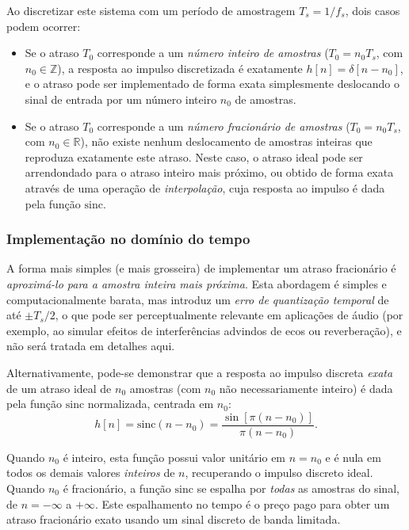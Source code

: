 \documentclass[a4paper,twoside,12pt]{article}
\begin{document}
	Ao discretizar este sistema com um período de amostragem $T_s = 1/f_s$, dois casos podem ocorrer:
	
	\begin{itemize}
		\item Se o atraso $T_0$ corresponde a um \emph{número inteiro de amostras} ($T_0 = n_0 T_s$, com $n_0 \in \mathbb{Z}$), a resposta ao impulso discretizada é exatamente $h[n] = \delta[n-n_0]$, e o atraso pode ser implementado de forma exata simplesmente deslocando o sinal de entrada por um número inteiro $n_0$ de amostras.
		
		\item Se o atraso $T_0$ corresponde a um \emph{número fracionário de amostras} ($T_0 = n_0 T_s$, com $n_0 \in \mathbb{R}$), não existe nenhum deslocamento de amostras inteiras que reproduza exatamente este atraso. Neste caso, o atraso ideal pode ser arrendondado para o atraso inteiro mais próximo, ou obtido de forma exata através de uma operação de \emph{interpolação}, cuja resposta ao impulso é dada pela função $\mathrm{sinc}$.
	\end{itemize}
	
	\subsubsection{Implementação no domínio do tempo}
	\label{sec:tempo}
	
	A forma mais simples (e mais grosseira) de implementar um atraso fracionário é \emph{aproximá-lo para a amostra inteira mais próxima}. Esta abordagem é simples e computacionalmente barata, mas introduz um \emph{erro de quantização temporal} de até $\pm T_s/2$, o que pode ser perceptualmente relevante em aplicações de áudio (por exemplo, ao simular efeitos de interferências advindos de ecos ou reverberação), e não será tratada em detalhes aqui.
	
	Alternativamente, pode-se demonstrar que a resposta ao impulso discreta \emph{exata} de um atraso ideal de $n_0$ amostras (com $n_0$ não necessariamente inteiro) é dada pela função $\mathrm{sinc}$ normalizada, centrada em $n_0$:
	\begin{equation}
		h[n] = \mathrm{sinc}(n - n_0) = \frac{\sin\left[\pi (n-n_0)\right]}{\pi (n-n_0)}.
	\end{equation}
	
	Quando $n_0$ é inteiro, esta função possui valor unitário em $n=n_0$ e é nula em todos os demais valores \emph{inteiros} de $n$, recuperando o impulso discreto ideal. Quando $n_0$ é fracionário, a função $\mathrm{sinc}$ se espalha por \emph{todas} as amostras do sinal, de $n=-\infty$ a $+\infty$. Este espalhamento no tempo é o preço pago para obter um atraso fracionário exato usando um sinal discreto de banda limitada.
	
\end{document}

